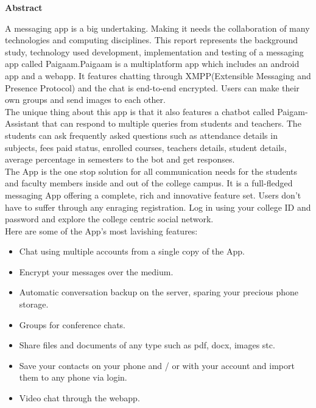 \begin{center}
{\Huge \bf{Abstract}\vskip 0.2in}
\end{center}

\noindent A messaging app is a big undertaking. Making it needs the collaboration of many technologies and computing disciplines. This report represents the background study, technology used development, implementation and testing of a messaging app called Paigaam.Paigaam is a multiplatform app which includes an android app and a webapp. It features chatting through XMPP(Extensible Messaging and Presence Protocol) and the chat is end-to-end encrypted. Users can make their own groups and send images to each other.\\

\noindent The unique thing about this app is that it also features a chatbot called Paigam-Assistant that can respond to multiple queries from students and teachers. The students can ask frequently asked questions such as attendance details in subjects, fees paid status, enrolled courses, teachers details, student details, average percentage in semesters to the bot and get responses.\\

\noindent The App is the one stop solution for all communication needs for the students and faculty members inside and out of the college campus. It is a full-fledged messaging App offering a complete, rich and innovative feature set. Users don't have to suffer through any enraging registration. Log in using your college ID and password and explore the college centric social network.
\\Here are some of the App's most lavishing features:
\begin{itemize}
\item Chat using multiple accounts from a single copy of the App.
\item Encrypt your messages over the medium.
\item Automatic conversation backup on the server, sparing your precious phone storage.
\item Groups for conference chats.
\item Share files and documents of any type such as pdf, docx, images stc.
\item Save your contacts on your phone and / or with your account and import them to any phone via login.
\item Video chat through the webapp.

\end{itemize}